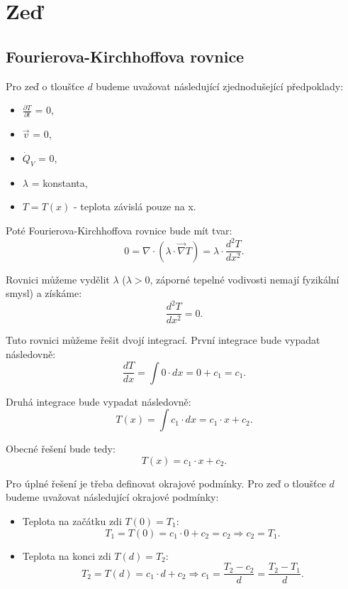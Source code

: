 \documentclass{article}
\begin{document}
\maketitle
\tableofcontents
\newpage




\section{ Zeď \spicy \spicy}



\subsection{Fourierova-Kirchhoffova rovnice \spicy \spicy \spicy}
Pro zeď o tloušťce $d$ budeme uvažovat následující zjednodušející předpoklady:
\begin{itemize}
    \item $\frac{\partial T}{\partial t}$ = 0,
    \item $\vec{v}$ = 0,
    \item $\dot{Q}_V$ = 0,
    \item $\lambda$ = konstanta,
    \item $T = T(x)$ - teplota závislá pouze na x.
\end{itemize}

Poté Fourierova-Kirchhoffova rovnice bude mít tvar:
$$
    0 = \nabla \cdot \left( \lambda \cdot \vec{\nabla} T \right) = \lambda \cdot \frac{d^2 T}{d x^2}.
$$

Rovnici můžeme vydělit $\lambda$ ($\lambda > 0$, záporné tepelné vodivosti nemají fyzikální smysl) a získáme:
$$
    \frac{d^2 T}{d x^2} = 0.
$$

Tuto rovnici můžeme řešit dvojí integrací. První integrace bude vypadat následovně:
$$
    \frac{d T}{d x} = \int 0 \cdot dx = 0 + c_1 = c_1.
$$

Druhá integrace bude vypadat následovně:
$$
    T(x) = \int c_1 \cdot dx = c_1 \cdot x + c_2.
$$

Obecné řešení bude tedy:
$$
    T(x) = c_1 \cdot x + c_2.
$$

Pro úplné řešení je třeba definovat okrajové podmínky. Pro zeď o tloušťce $d$ budeme uvažovat následující okrajové podmínky:
\begin{itemize}
    \item Teplota na začátku zdi $T(0) = T_1$:
          $$
              T_1 = T(0) = c_1 \cdot 0 + c_2 = c_2 \Rightarrow c_2 = T_1.
          $$
    \item Teplota na konci zdi $T(d) = T_2$:
          $$
              T_2 = T(d) = c_1 \cdot d + c_2 \Rightarrow c_1 = \frac{T_2 - c_2}{d} = \frac{T_2 - T_1}{d}.
          $$
\end{itemize}
\end{document}
